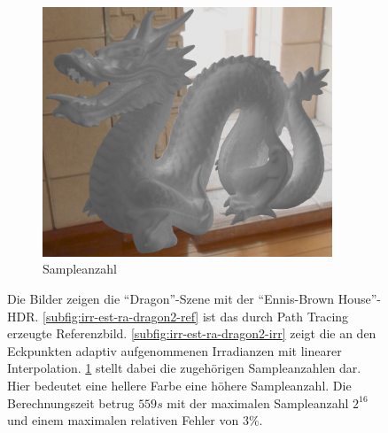 \begin{figure}[h]
\begin{subfigure}[t]{0.33\textwidth}
			\end{subfigure}
			\begin{subfigure}[t]{0.33\textwidth}
				\center
				\includegraphics[width=0.95\textwidth]{pic/irr_est-ra-dragon2-scount.png}
				\caption{Sampleanzahl}
				\label{subfig:irr-est-ra-dragon2-scount}
			\end{subfigure}
			\caption[Zweite adaptive Vertex-Irradiance-Map anhand der \enquote{Dragon}-Szene]{Die Bilder zeigen die \enquote{Dragon}-Szene mit der \enquote{Ennis-Brown House}-HDR. \ref{subfig:irr-est-ra-dragon2-ref} ist das durch Path Tracing erzeugte Referenzbild. \ref{subfig:irr-est-ra-dragon2-irr} zeigt die an den Eckpunkten adaptiv aufgenommenen Irradianzen mit linearer Interpolation. \ref{subfig:irr-est-ra-dragon2-scount} stellt dabei die zugehörigen Sampleanzahlen dar. Hier bedeutet eine hellere Farbe eine höhere Sampleanzahl. Die Berechnungszeit betrug $559\unit{s}$ mit der maximalen Sampleanzahl $2^{16}$ und einem maximalen relativen Fehler von $3\unit{\%}$.}
			\label{fig:irr-est-ra-dragon2}
		\end{figure}

